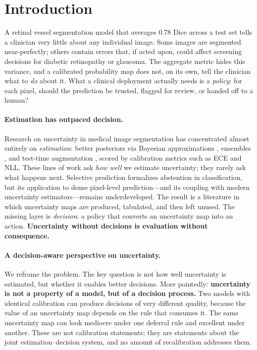 \section{Introduction}
\label{sec:introduction}

A retinal vessel segmentation model that averages 0.78 Dice across a test
set tells a clinician very little about any individual image. Some images
are segmented near-perfectly; others contain errors that, if acted upon,
could affect screening decisions for diabetic retinopathy or glaucoma. The
aggregate metric hides this variance, and a calibrated probability map does
not, on its own, tell the clinician what to \emph{do} about it. What a
clinical deployment actually needs is a \emph{policy}: for each pixel,
should the prediction be trusted, flagged for review, or handed off to a
human?

\paragraph{Estimation has outpaced decision.} Research on uncertainty in
medical image segmentation has concentrated almost entirely on
\emph{estimation}: better posteriors via Bayesian approximations
\citep{gal2016dropout}, ensembles \citep{lakshminarayanan2017simple}, and
test-time augmentation \citep{wang2019aleatoric}, scored by calibration
metrics such as ECE and NLL. These lines of work ask \emph{how well} we
estimate uncertainty; they rarely ask what happens next. Selective
prediction \citep{geifman2017selective,el2010foundations} formalizes
abstention in classification, but its application to dense pixel-level
prediction---and its coupling with modern uncertainty estimators---remains
underdeveloped. The result is a literature in which uncertainty maps are
produced, tabulated, and then left unused. The missing layer is
\emph{decision}: a policy that converts an uncertainty map into an action.
\textbf{Uncertainty without decisions is evaluation without consequence.}

\paragraph{A decision-aware perspective on uncertainty.} We reframe the
problem. The key question is not how well uncertainty is estimated, but
whether it enables better decisions. More pointedly: \textbf{uncertainty
is not a property of a model, but of a decision process.} Two models with
identical calibration can produce decisions of very different quality,
because the value of an uncertainty map depends on the rule that consumes
it. The same uncertainty map can look mediocre under one deferral rule
and excellent under another. These are not calibration statements; they
are statements about the joint estimation--decision system, and no
amount of recalibration addresses them.


